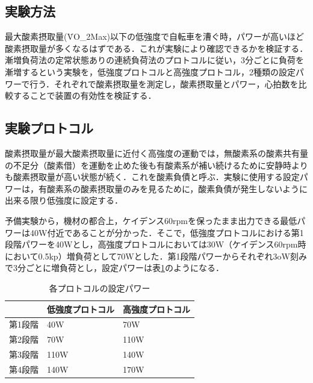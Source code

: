 


\subsection{実験方法}

最大酸素摂取量(\.{V}O_2Max)以下の低強度で自転車を漕ぐ時，パワーが高いほど酸素摂取量が多くなるはずである．これが実験により確認できるかを検証する．漸増負荷法の定常状態ありの連続負荷法のプロトコルに従い\cite{science_of_vo2}，3分ごとに負荷を漸増するという実験を，低強度プロトコルと高強度プロトコル，2種類の設定パワーで行う．それぞれで酸素摂取量を測定し，酸素摂取量とパワー，心拍数を比較することで装置の有効性を検証する．

\subsection{実験プロトコル}
\label{sec:setting_protocol}

酸素摂取量が最大酸素摂取量に近付く高強度の運動では，無酸素系の酸素共有量の不足分（酸素借）を運動を止めた後も有酸素系が補い続けるために安静時よりも酸素摂取量が高い状態が続く．これを酸素負債と呼ぶ．実験に使用する設定パワーは，有酸素系の酸素摂取量のみを見るために，酸素負債が発生しないように出来る限り低強度に設定する．

予備実験から，機材の都合上，ケイデンス60rpmを保ったまま出力できる最低パワーは40W付近であることが分かった．そこで，低強度プロトコルにおける第1段階パワーを40Wとし，高強度プロトコルにおいては30W（ケイデンス60rpm時において0.5kp）増負荷として70Wとした．第1段階パワーからそれぞれ3oW刻みで3分ごとに増負荷とし，設定パワーは表\ref{tb:protocol_power}のようになる．

\begin{table}[H]
\begin{center}
  \caption{各プロトコルの設定パワー}
  \label{tb:protocol_power}
  \begin{tabular}{|l|l|l|}
  \hline
       & 低強度プロトコル & 高強度プロトコル \\ \hline
  第1段階 & 40W      & 70W      \\ \hline
  第2段階 & 70W      & 110W     \\ \hline
  第3段階 & 110W     & 140W     \\ \hline
  第4段階 & 140W     & 170W     \\ \hline
  \end{tabular}
\end{center}
\end{table}

